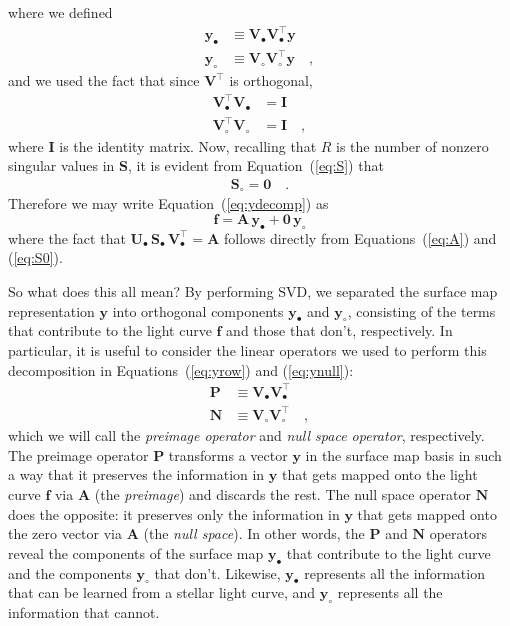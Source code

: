 \documentclass[modern]{aastex62}
\begin{document}
%
where we defined
%
\begin{align}
    \label{eq:yrow}
    \mathbf{y}_\bullet & \equiv \mathbf{V}_\bullet \mathbf{V}_\bullet^\top \mathbf{y}
    \\
    \label{eq:ynull}
    \mathbf{y}_\circ   & \equiv \mathbf{V}_\circ \mathbf{V}_\circ^\top \mathbf{y}
    \quad,
\end{align}
%
and we used the fact that since $\mathbf{V}^\top$ is orthogonal,
%
\begin{align}
    \mathbf{V}_\bullet^\top \mathbf{V}_\bullet & = \mathbf{I}
    \nonumber                                                 \\
    \mathbf{V}_\circ^\top \mathbf{V}_\circ     & = \mathbf{I}
    \quad,
\end{align}
%
where $\mathbf{I}$ is the identity matrix.
%
Now, recalling that $R$ is the number of nonzero singular values in
$\mathbf{S}$, it is evident from Equation~(\ref{eq:S}) that
%
\begin{align}
    \label{eq:S0}
    \mathbf{S}_\circ = \mathbf{0}
    \quad.
\end{align}
%
Therefore we may write Equation~(\ref{eq:ydecomp}) as
%
\begin{equation}
    \boxed{
        \mathbf{f} = \mathbf{A} \, \mathbf{y}_\bullet
        +
        \mathbf{0} \, \mathbf{y}_\circ
    }
\end{equation}
%
where the fact that $\mathbf{U}_\bullet \, \mathbf{S}_\bullet \, \mathbf{V}_\bullet^\top = \mathbf{A}$
follows directly from Equations~(\ref{eq:A}) and (\ref{eq:S0}).

So what does this all mean? By performing SVD, we separated
the surface map representation $\mathbf{y}$ into orthogonal components
$\mathbf{y}_\bullet$ and $\mathbf{y}_\circ$, consisting of the
terms that contribute to the light curve $\mathbf{f}$ and those
that don't, respectively. In particular, it is useful to consider
the linear operators we used to perform this decomposition
in Equations~(\ref{eq:yrow}) and (\ref{eq:ynull}):
%
\begin{align}
    \mathbf{P} & \equiv \mathbf{V}_\bullet \mathbf{V}_\bullet^\top
    \\
    \mathbf{N} & \equiv \mathbf{V}_\circ \mathbf{V}_\circ^\top
    \quad,
\end{align}
%
which we will call the \emph{preimage operator} and \emph{null space
    operator}, respectively. The preimage operator $\mathbf{P}$
transforms a vector $\mathbf{y}$ in the surface map basis in such a way
that it preserves the information in $\mathbf{y}$ that gets mapped
onto the light curve $\mathbf{f}$ via $\mathbf{A}$ (the \emph{preimage}) and discards the rest. The
null space operator $\mathbf{N}$ does the opposite: it preserves only
the information in $\mathbf{y}$ that gets mapped onto the zero
vector via $\mathbf{A}$ (the \emph{null space}).
%
In other words,
the $\mathbf{P}$ and $\mathbf{N}$ operators reveal the
components of the surface map $\mathbf{y}_\bullet$ that contribute to the
light curve and the components $\mathbf{y}_\circ$ that don't.
Likewise, $\mathbf{y}_\bullet$ represents all the information that can be
learned from a stellar light curve, and $\mathbf{y}_\circ$ represents all the
information that cannot.
\end{document}
